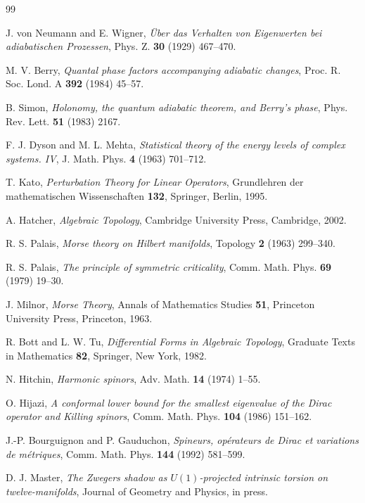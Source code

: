 \documentclass[11pt]{article}
\numberwithin{equation}{section}
\theoremstyle{plain}
\theoremstyle{definition}
\theoremstyle{remark}
\begin{document}
\begin{thebibliography}{99}

J. von Neumann and E. Wigner,
\emph{\"Uber das Verhalten von Eigenwerten bei adiabatischen
Prozessen},
Phys. Z. \textbf{30} (1929) 467--470.

M. V. Berry,
\emph{Quantal phase factors accompanying adiabatic changes},
Proc. R. Soc. Lond. A \textbf{392} (1984) 45--57.

B. Simon,
\emph{Holonomy, the quantum adiabatic theorem, and Berry's phase},
Phys. Rev. Lett. \textbf{51} (1983) 2167.

F. J. Dyson and M. L. Mehta,
\emph{Statistical theory of the energy levels of complex systems.
IV},
J. Math. Phys. \textbf{4} (1963) 701--712.

T. Kato,
\emph{Perturbation Theory for Linear Operators},
Grundlehren der mathematischen Wissenschaften \textbf{132},
Springer, Berlin, 1995.

A. Hatcher,
\emph{Algebraic Topology},
Cambridge University Press, Cambridge, 2002.

R. S. Palais,
\emph{Morse theory on Hilbert manifolds},
Topology \textbf{2} (1963) 299--340.

R. S. Palais,
\emph{The principle of symmetric criticality},
Comm. Math. Phys. \textbf{69} (1979) 19--30.

J. Milnor,
\emph{Morse Theory},
Annals of Mathematics Studies \textbf{51},
Princeton University Press, Princeton, 1963.

R. Bott and L. W. Tu,
\emph{Differential Forms in Algebraic Topology},
Graduate Texts in Mathematics \textbf{82},
Springer, New York, 1982.

N. Hitchin,
\emph{Harmonic spinors},
Adv. Math. \textbf{14} (1974) 1--55.

O. Hijazi,
\emph{A conformal lower bound for the smallest eigenvalue of the
Dirac operator and Killing spinors},
Comm. Math. Phys. \textbf{104} (1986) 151--162.

J.-P. Bourguignon and P. Gauduchon,
\emph{Spineurs, op\'erateurs de Dirac et variations de m\'etriques},
Comm. Math. Phys. \textbf{144} (1992) 581--599.

D. J. Master,
\emph{The Zwegers shadow as $U(1)$-projected intrinsic torsion on
twelve-manifolds},
Journal of Geometry and Physics, in press.

\end{thebibliography}
\end{document}
